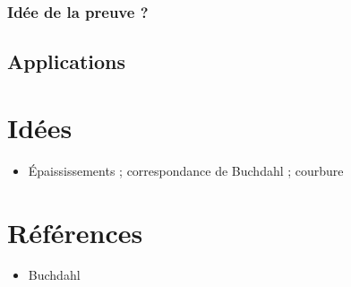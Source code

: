 \documentclass[a4paper]{amsart}
\begin{document}
\subsubsection{Idée de la preuve ?}
\label{sec:orgdefea85}



\subsection{Applications}
\label{sec:org785a21a}

\section{Idées}
\label{sec:org2a8d4e1}
\begin{itemize}
\item Épaississements ; correspondance de Buchdahl ; courbure
\end{itemize}
\section{Références}
\label{sec:org98cf8fc}
\begin{itemize}
\item Buchdahl
\end{itemize}
\end{document}
